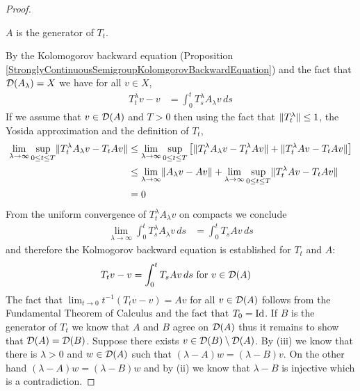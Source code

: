\begin{proof}
\begin{clm} $A$ is the generator of $T_t$.
\end{clm}
By the Kolomogorov backward equation (Proposition \ref{StronglyContinuousSemigroupKolomgorovBackwardEquation}) and the fact that $\mathcal{D}(A_\lambda) = X$ we have for all $v \in X$,
\begin{align*}
T^\lambda_t v - v &= \int_0^t T^\lambda_s A_\lambda v \, ds
\end{align*}
If we assume that $v \in \mathcal{D}(A)$ and $T > 0$ then using the fact that $\lVert T^\lambda_t \rVert \leq 1$, the Yosida approximation and the definition of $T_t$,
\begin{align*}
\lim_{\lambda \to \infty} \sup_{0 \leq t \leq T} \lVert T^\lambda_t A_\lambda v - T_t A v \rVert 
&\leq \lim_{\lambda \to \infty} \sup_{0 \leq t \leq T} \left[ \lVert T^\lambda_t A_\lambda v - T^\lambda_t A v \rVert + \lVert T^\lambda_t A v - T_t A v \rVert \right]\\
&\leq \lim_{\lambda \to \infty} \lVert A_\lambda v - A v \rVert + \lim_{\lambda \to \infty} \sup_{0 \leq t \leq T} \lVert T^\lambda_t A v - T_t A v \rVert  \\
&=0
\end{align*}
From the uniform convergence of $T^\lambda_t A_\lambda v $ on compacts we conclude 
\begin{align*}
\lim_{\lambda \to \infty} \int_0^t T^\lambda_s A_\lambda v \, ds &= \int_0^t T_s A v \, ds
\end{align*}
and therefore the Kolmogorov backward equation is established for $T_t$ and $A$:
\begin{align*}
T_t v - v &= \int_0^t T_s A v \, ds \text{ for $v \in \mathcal{D}(A)$}
\end{align*}
The fact that $\lim_{t \to 0} t^{-1} (T_t v -v) =Av$ for all $v \in \mathcal{D}(A)$ follows from the Fundamental Theorem of Calculus and the fact that $T_0 = \operatorname*{Id}$.  If $B$ is the 
generator of $T_t$ we know that $A$ and $B$ agree on $\mathcal{D}(A)$ thus it remains to show that $\mathcal{D}(A)=\mathcal{D}(B)$.  Suppose there exists $v \in \mathcal{D}(B) \setminus \mathcal{D}(A)$.  By (iii) we know that there is $\lambda > 0$ and $w \in \mathcal{D}(A)$ such that $(\lambda - A) w = (\lambda - B) v$.  On the other hand $(\lambda - A) w =(\lambda - B) w$ and by (ii) we know that $\lambda - B$ is injective which is a contradiction.
\end{proof}

